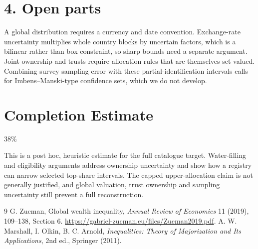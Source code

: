 \documentclass[11pt]{article}
\theoremstyle{definition}
\begin{document}
\section*{4. Open parts}
A global distribution requires a currency and date convention. Exchange-rate uncertainty multiplies whole country blocks
by uncertain factors, which is a bilinear rather than box constraint, so sharp bounds need a separate argument. Joint
ownership and trusts require allocation rules that are themselves set-valued. Combining survey sampling error with these
partial-identification intervals calls for Imbens--Manski-type confidence sets, which we do not develop.

\section{Completion Estimate}
38\%

This is a post hoc, heuristic estimate for the full catalogue target.
Water-filling and eligibility arguments address ownership uncertainty and show how a registry can narrow selected top-share intervals. The capped upper-allocation claim is not generally justified, and global valuation, trust ownership and sampling uncertainty still prevent a full reconstruction.

\begin{thebibliography}{9}
 G. Zucman, Global wealth inequality, \emph{Annual Review of Economics} 11 (2019), 109--138, Section 6.
\url{https://gabriel-zucman.eu/files/Zucman2019.pdf}.
 A. W. Marshall, I. Olkin, B. C. Arnold, \emph{Inequalities: Theory of Majorization and Its Applications}, 2nd ed., Springer (2011).
\end{thebibliography}
\end{document}
